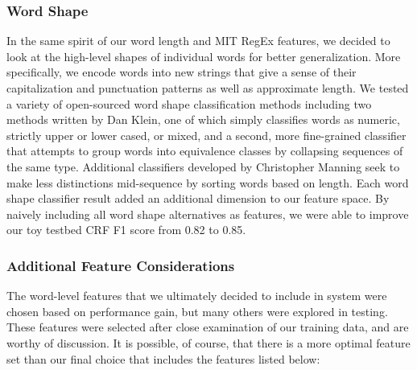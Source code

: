 \documentclass[preprint]{style}
\begin{document}
\subsubsection{Word Shape}
In the same spirit of our word length and MIT RegEx features, we decided to look at the high-level shapes of individual words for better generalization. More specifically, we encode words into new strings that give a sense of their capitalization and punctuation patterns as well as approximate length. We tested a variety of open-sourced word shape classification methods including two methods written by Dan Klein, one of which simply classifies words as numeric, strictly upper or lower cased, or mixed, and a second, more fine-grained classifier that attempts to group words into equivalence classes by collapsing sequences of the same type. Additional classifiers developed by Christopher Manning seek to make less distinctions mid-sequence by sorting words based on length. Each word shape classifier result added an additional dimension to our feature space. By naively including all word shape alternatives as features, we were able to improve our toy testbed CRF F1 score from 0.82 to 0.85.

\subsubsection{Additional Feature Considerations}
The word-level features that we ultimately decided to include in system were chosen based on performance gain, but many others were explored in testing. These features were selected after close examination of our training data, and are worthy of discussion. It is possible, of course, that there is a more optimal feature set than our final choice that includes the features listed below:
\end{document}
